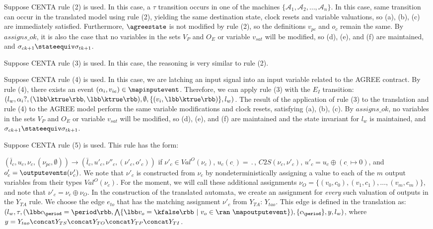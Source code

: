 Suppose CENTA rule (2) is used.  In this case, a $\tau$ transition occurs in one of the machines $\{\mathcal{A}_{1}, \mathcal{A}_{2}, \ldots, \mathcal{A}_{n}\}$.  In this case, same transition can occur in the translated model using rule (2), yielding the same destination state, clock resets and variable valuations, so (a), (b), (c) are immediately satisfied.  Furthermore, $\agreestate$ is not modified by rule (2), so the definitions $v_{pc}$ and $o_{c}$ remain the same.  By $assigns\_ok$, it is also the case that no variables in the sets $V_{P}$ and $O_{E}$ or variable $v_{sat}$ will be modified, so (d), (e), and (f) are maintained, and $\sigma_{ck+1} \stateequiv \sigma_{tk+1}$.

Suppose CENTA rule (3) is used.  In this case, the reasoning is very similar to rule (2).

Suppose CENTA rule (4) is used.  In this case, we are latching an input signal into an input variable related to the AGREE contract.  By rule (4), there exists an event $(\alpha_{i}, v_{ie}) \in \mapinputevent$.  Therefore, we can apply rule (3) with the $E_I$ transition:
$(l_{w}, \alpha_{i}?, (\lbb \ktrue \rbb, \lbb \ktrue \rbb), \emptyset, \{ (v_{i}, \lbb \ktrue \rbb) \}, l_{w})$. The result of the application of rule (3) to the translation and rule (4) to the AGREE model perform the same variable modifications and clock resets, satisfying (a), (b), (c).  By $assigns\_ok$, no variables in the sets $V_{P}$ and $O_{E}$ or variable $v_{sat}$ will be modified, so (d), (e), and (f) are maintained and the state invariant for $l_{w}$ is maintained, and $\sigma_{ck+1} \stateequiv \sigma_{tk+1}$.

Suppose CENTA rule (5) is used.  This rule has the form:

$(\bar{l}_{c},u_{c}, \nu_{c}, (\nu_{pc}, \emptyset)) \rightarrow (\bar{l}_{c}, u'_{c}, \nu''_{c}, (\nu'_{c}, o'_{c}))$ if $\nu'_{c} \in Val^{O}(\nu_{c})$, $u_{c}(c_{\period}) = \period$, $C2S(\nu_{c}, \nu'_{c})$, $u'_{c} = u_{c} \oplus (c_{\period} \mapsto 0)$, and $o'_{c} = \outputevents(\nu'_{c})$.  We note that $\nu'_{c}$ is constructed from $\nu_{c}$ by nondeterministically assigning a value to each of the $m$ output variables from their types $Val^{O}(\nu_{c})$.  For the moment, we will call these additional assignments $\nu_{O} = \{(v_{0}, c_0), (v_1, c_1), \ldots, (v_m, c_m)\}$, and note that $\nu'_{c} = \nu_{c} \oplus \nu_{O}$.  In the construction of the translated automata, we create an assignment for {\em every} such valuation of outputs in the $Y_{TA}$ rule.  We choose the edge $e_{to}$ that has the matching assignment $\nu'_{c}$ from $Y_{TA}$: $Y_{tao}$.  This edge is defined in the translation as: $(l_{w}, \tau, (\lbb c_{\period} = \period \rbb, \bigwedge \{\lbb v_{o} = \kfalse\rbb~|~v_{o} \in \ran~\mapoutputevent \} ), \{c_{\period}\}, y, l_{w})$, where $y = Y_{tao} \concat Y_{TS} \concat Y_{TO} \concat Y_{TP} \concat Y_{TI} $.

